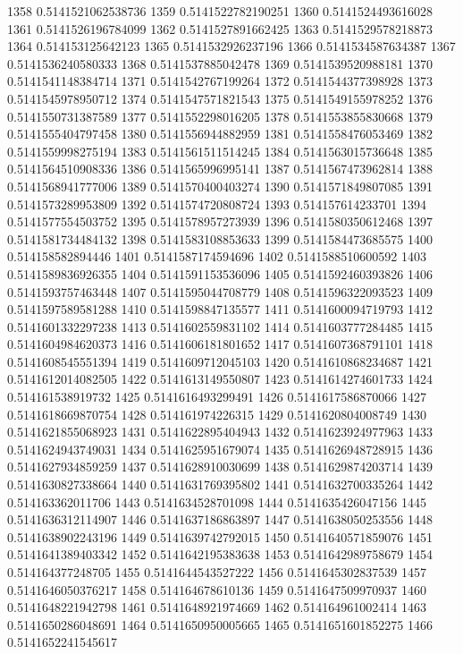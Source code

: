 1358 0.5141521062538736
1359 0.5141522782190251
1360 0.5141524493616028
1361 0.5141526196784099
1362 0.5141527891662425
1363 0.5141529578218873
1364 0.514153125642123
1365 0.5141532926237196
1366 0.5141534587634387
1367 0.5141536240580333
1368 0.5141537885042478
1369 0.5141539520988181
1370 0.5141541148384714
1371 0.5141542767199264
1372 0.5141544377398928
1373 0.5141545978950712
1374 0.5141547571821543
1375 0.5141549155978252
1376 0.5141550731387589
1377 0.5141552298016205
1378 0.5141553855830668
1379 0.5141555404797458
1380 0.5141556944882959
1381 0.5141558476053469
1382 0.5141559998275194
1383 0.5141561511514245
1384 0.5141563015736648
1385 0.5141564510908336
1386 0.5141565996995141
1387 0.5141567473962814
1388 0.5141568941777006
1389 0.5141570400403274
1390 0.5141571849807085
1391 0.5141573289953809
1392 0.5141574720808724
1393 0.514157614233701
1394 0.5141577554503752
1395 0.5141578957273939
1396 0.5141580350612468
1397 0.5141581734484132
1398 0.5141583108853633
1399 0.5141584473685575
1400 0.514158582894446
1401 0.5141587174594696
1402 0.5141588510600592
1403 0.5141589836926355
1404 0.5141591153536096
1405 0.5141592460393826
1406 0.5141593757463448
1407 0.5141595044708779
1408 0.5141596322093523
1409 0.5141597589581288
1410 0.5141598847135577
1411 0.5141600094719793
1412 0.5141601332297238
1413 0.5141602559831102
1414 0.5141603777284485
1415 0.5141604984620373
1416 0.5141606181801652
1417 0.5141607368791101
1418 0.5141608545551394
1419 0.5141609712045103
1420 0.5141610868234687
1421 0.5141612014082505
1422 0.5141613149550807
1423 0.5141614274601733
1424 0.514161538919732
1425 0.5141616493299491
1426 0.5141617586870066
1427 0.5141618669870754
1428 0.514161974226315
1429 0.5141620804008749
1430 0.5141621855068923
1431 0.5141622895404943
1432 0.5141623924977963
1433 0.5141624943749031
1434 0.5141625951679074
1435 0.5141626948728915
1436 0.5141627934859259
1437 0.5141628910030699
1438 0.5141629874203714
1439 0.5141630827338664
1440 0.5141631769395802
1441 0.5141632700335264
1442 0.514163362011706
1443 0.5141634528701098
1444 0.5141635426047156
1445 0.5141636312114907
1446 0.5141637186863897
1447 0.5141638050253556
1448 0.5141638902243196
1449 0.5141639742792015
1450 0.5141640571859076
1451 0.5141641389403342
1452 0.5141642195383638
1453 0.5141642989758679
1454 0.514164377248705
1455 0.5141644543527222
1456 0.5141645302837539
1457 0.5141646050376217
1458 0.514164678610136
1459 0.5141647509970937
1460 0.5141648221942798
1461 0.5141648921974669
1462 0.514164961002414
1463 0.5141650286048691
1464 0.5141650950005665
1465 0.5141651601852275
1466 0.5141652241545617
